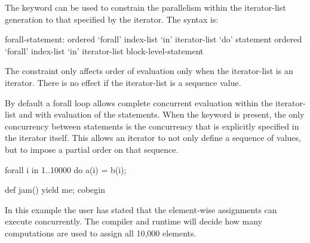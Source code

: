 The  keyword can be used to constrain the parallelism
within the iterator-list generation to that specified by the iterator.
The syntax is:
\begin{syntax}
forall-statement:
   ordered `forall' index-list `in' iterator-list `do' statement
   ordered `forall' index-list `in' iterator-list block-level-statement
\end{syntax}

The  constraint only affects order of evaluation only
when the iterator-list is an iterator. There is no effect if the
iterator-list is a sequence value.

By default a forall loop allows complete concurrent evaluation within
the iterator-list and with evaluation of the statements. When
the  keyword is present, the only concurrency between
statements is the concurrency that is explicitly specified in the
iterator itself. This allows an iterator to not only define a sequence of
values, but to impose a partial order on that sequence.


\begin{example}
\begin{chapel}
forall i in 1..10000 do
  a(i) = b(i);

def jam() {
  yield me;
  cobegin {
  }
}
\end{chapel}
In this example the user has stated that the element-wise assignments can
execute concurrently. The compiler and runtime will decide how many
computations are used to assign all 10,000 elements.
\end{example}

